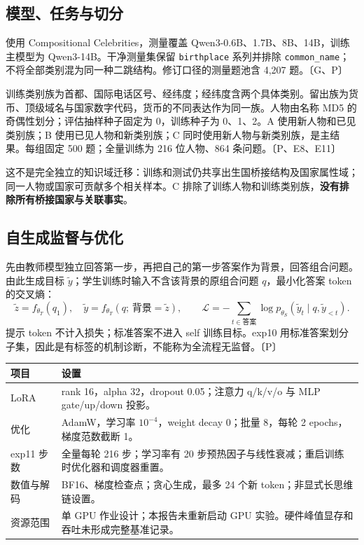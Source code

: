 \documentclass[11pt,a4paper]{article}
\newcommand{\ev}[1]{{\color{muted}\small〔#1〕}}
\begin{document}
\subsection{模型、任务与切分}
使用 Compositional Celebrities，测量覆盖 Qwen3-0.6B、1.7B、8B、14B，训练主模型为 Qwen3-14B。干净测量集保留 \texttt{birthplace} 系列并排除 \texttt{common\_name}；不将全部类别混为同一种二跳结构。修订口径的测量题池含 4,207 题。\ev{G、P}

训练类别族为首都、国际电话区号、经纬度；经纬度含两个具体类别。留出族为货币、顶级域名与国家数字代码，货币的不同表达作为同一族。人物由名称 MD5 的奇偶性划分；评估抽样种子固定为 0，训练种子为 0、1、2。A 使用新人物和已见类别族；B 使用已见人物和新类别族；C 同时使用新人物与新类别族，是主结果。每组固定 500 题；全量训练为 216 位人物、864 条问题。\ev{P、E8、E11}

这不是完全独立的知识域迁移：训练和测试仍共享出生国桥接结构及国家属性域；同一人物或国家可贡献多个相关样本。C 排除了训练人物和训练类别族，\textbf{没有排除所有桥接国家与关联事实}。
\subsection{自生成监督与优化}
先由教师模型独立回答第一步，再把自己的第一步答案作为背景，回答组合问题。由此生成目标 $\tilde y$；学生训练时输入不含该背景的原组合问题 $q$，最小化答案 token 的交叉熵：
\[
\tilde z=f_{\theta_T}(q_1),\quad
\tilde y=f_{\theta_T}(q;\,\text{背景}=\tilde z),\qquad
\mathcal L=-\sum_{t\in\text{答案}}\log p_{\theta_S}(\tilde y_t\mid q,\tilde y_{<t}).
\]
提示 token 不计入损失；标准答案不进入 self 训练目标。exp10 用标准答案划分子集，因此是有标签的机制诊断，不能称为全流程无监督。\ev{P}
\begin{center}\small
{}
\begin{tabularx}{\linewidth}{@{}p{34mm}Y@{}}\toprule
项目 & 设置 \\\midrule
LoRA & rank 16，alpha 32，dropout 0.05；注意力 q/k/v/o 与 MLP gate/up/down 投影。\\
优化 & AdamW，学习率 $10^{-4}$，weight decay 0；批量 8，每轮 2 epochs，梯度范数截断 1。\\
exp11 步数 & 全量每轮 216 步；学习率有 20 步预热因子与线性衰减；重启训练时优化器和调度器重置。\\
数值与解码 & BF16、梯度检查点；贪心生成，最多 24 个新 token；非显式长思维链设置。\\
资源范围 & 单 GPU 作业设计；本报告未重新启动 GPU 实验。硬件峰值显存和吞吐未形成完整基准记录。\\\bottomrule
\end{tabularx}
\end{center}
\end{document}
